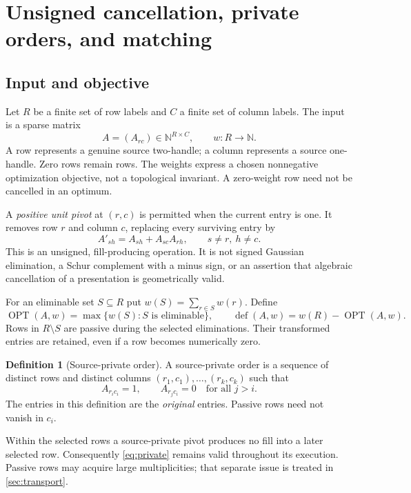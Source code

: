 \documentclass[11pt,letterpaper]{article}
\theoremstyle{definition}
\newtheorem{definition}[definition]{Definition}\aliascntresetthe{definition}
\theoremstyle{remark}
\newcommand{\NN}{\mathbb N}
\newcommand{\OPT}{\operatorname{OPT}}
\newcommand{\defw}{\operatorname{def}}
\begin{document}
\section{Unsigned cancellation, private orders, and matching}
\label{sec:model}

\subsection{Input and objective}
Let $R$ be a finite set of row labels and $C$ a finite set of column labels. The input is a sparse matrix
\[
 A=(A_{rc})\in\NN^{R\times C},\qquad w:R\longrightarrow\NN.
\]
A row represents a genuine source two-handle; a column represents a source one-handle. Zero rows remain rows. The weights express a chosen nonnegative optimization objective, not a topological invariant. A zero-weight row need not be cancelled in an optimum.

A \emph{positive unit pivot} at $(r,c)$ is permitted when the current entry is one. It removes row $r$ and column $c$, replacing every surviving entry by
\begin{equation}
 A'_{sh}=A_{sh}+A_{sc}A_{rh},\qquad s\ne r,\ h\ne c.
 \label{eq:positive}
\end{equation}
This is an unsigned, fill-producing operation. It is not signed Gaussian elimination, a Schur complement with a minus sign, or an assertion that algebraic cancellation of a presentation is geometrically valid.

For an eliminable set $S\subseteq R$ put $w(S)=\sum_{r\in S}w(r)$. Define
\[
 \OPT(A,w)=\max\{w(S):S\text{ is eliminable}\},\qquad
 \defw(A,w)=w(R)-\OPT(A,w).
\]
Rows in $R\setminus S$ are passive during the selected eliminations. Their transformed entries are retained, even if a row becomes numerically zero.

\begin{definition}[Source-private order]
A source-private order is a sequence of distinct rows and distinct columns
$(r_1,c_1),\ldots,(r_k,c_k)$ such that
\begin{equation}
 A_{r_i c_i}=1,\qquad A_{r_j c_i}=0\quad\text{for all }j>i.
 \label{eq:private}
\end{equation}
The entries in this definition are the \emph{original} entries. Passive rows need not vanish in $c_i$.
\end{definition}

Within the selected rows a source-private pivot produces no fill into a later selected row. Consequently \cref{eq:private} remains valid throughout its execution. Passive rows may acquire large multiplicities; that separate issue is treated in \cref{sec:transport}.
\end{document}

